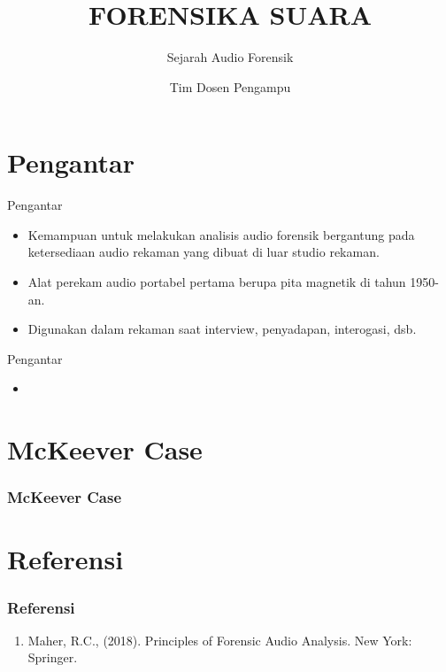 \documentclass[pdflatex,compress]{beamer}
\title{FORENSIKA SUARA}
\subtitle{Sejarah Audio Forensik}
\author{Tim Dosen Pengampu}
\begin{document}
\maketitle

\section{Pengantar}

\begin{frame}{Pengantar}
	\begin{itemize}
		\item Kemampuan untuk melakukan analisis audio forensik bergantung pada ketersediaan audio rekaman yang dibuat di luar studio rekaman.
		\item Alat perekam audio portabel pertama berupa pita magnetik di tahun 1950-an.
		\item Digunakan dalam rekaman saat interview, penyadapan, interogasi, dsb.
	\end{itemize}
\end{frame}

\begin{frame}{Pengantar}
	\begin{itemize}
		\item 
	\end{itemize}
\end{frame}

\section{McKeever Case}

\begin{frame}
	\frametitle{McKeever Case}
	
\end{frame}
\section{Referensi}

\begin{frame}
	\frametitle{Referensi}
	\begin{enumerate}
		\item Maher, R.C., (2018). Principles of Forensic Audio Analysis. New York: Springer.
	\end{enumerate}
\end{frame}
\end{document}
